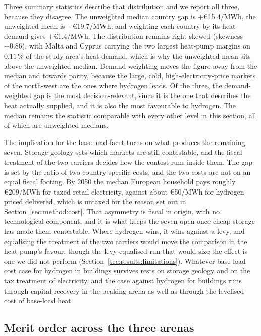 Three summary statistics describe that distribution and we report all three, because
they disagree. The unweighted median country gap is $+$\euro{}15.4/MWh, the unweighted
mean is $+$\euro{}19.7/MWh, and weighting each country by its heat demand gives
$+$\euro{}1.4/MWh. The distribution remains right-skewed (skewness $+0.86$), with
Malta and Cyprus carrying the two largest heat-pump margins on $0.11\,\%$ of the study
area's heat demand, which is why the unweighted mean sits above the unweighted median.
Demand weighting moves the figure away from the median and towards parity,
because the large, cold, high-electricity-price markets of the north-west are the ones
where hydrogen leads. Of the three, the demand-weighted gap is the most
decision-relevant, since it is the one that describes the heat actually supplied, and
it is also the most favourable to hydrogen. The median remains the statistic
comparable with every other level in this section, all of which are unweighted
medians.

The implication for the base-load facet turns on what produces the remaining
seven. Storage geology sets which markets are still contestable, and the fiscal
treatment of the two carriers decides how the contest runs inside them. The
gap is set by the ratio of two country-specific costs, and the two costs are
not on an equal fiscal footing. By 2050 the median European household pays roughly \euro{}209/MWh for
taxed retail electricity, against about \euro{}50/MWh for hydrogen priced
delivered, which is untaxed for the reason set out in
Section~\ref{sec:method:cost}. That asymmetry is fiscal in origin, with no technological component, and it is what keeps the seven open once
cheap storage has made them contestable. Where hydrogen wins, it wins against a levy,
and equalising the treatment of the two carriers would move the comparison in the heat
pump's favour, though the levy-equalised run that would size the effect is one we did
not perform (Section~\ref{sec:results:limitations}). Whatever base-load cost case for hydrogen in buildings survives rests on
storage geology and on the tax treatment of electricity, and the case against hydrogen for buildings runs through capital recovery in the peaking arena as well as
through the levelised cost of base-load heat.


\subsection{Merit order across the three arenas}
\label{sec:results:merit}

